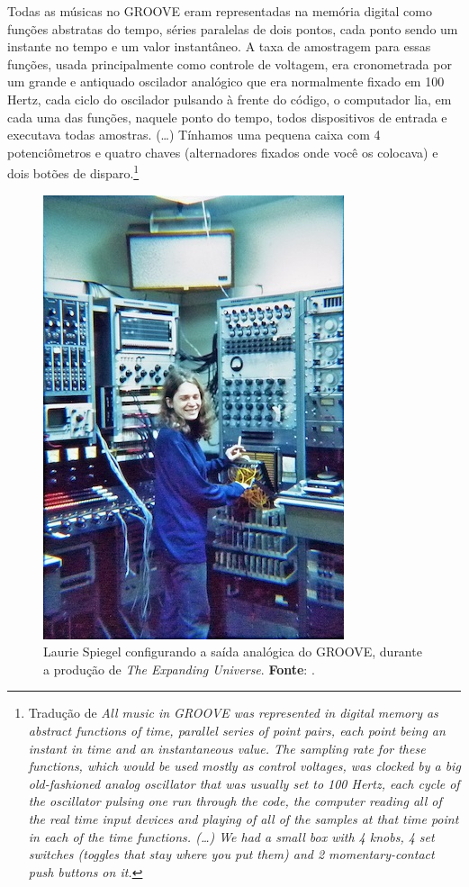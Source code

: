 \begin{citacao}
Todas as músicas no GROOVE eram representadas na memória digital como funções abstratas do tempo, séries paralelas de dois pontos, cada ponto sendo um instante no tempo e um valor instantâneo. A taxa de amostragem para essas funções, usada principalmente como controle de voltagem, era cronometrada por um grande e antiquado oscilador analógico que era normalmente fixado em 100 Hertz, cada ciclo do oscilador pulsando à frente do código, o computador lia, em cada uma das funções, naquele ponto do tempo, todos dispositivos de entrada e executava todas amostras. (\ldots) Tínhamos uma pequena caixa com 4 potenciômetros e quatro chaves (alternadores fixados onde você os colocava) e dois botões de disparo.\footnote{Tradução de \emph{All music in GROOVE was represented in digital memory as abstract functions of time, parallel series of point pairs, each point being an instant in time and an instantaneous value. The sampling rate for these functions, which would be used mostly as control voltages, was clocked by a big old-fashioned analog oscillator that was usually set to 100 Hertz, each cycle of the oscillator pulsing one run through the code, the computer reading all of the real time input devices and playing of all of the samples at that time point in each of the time functions. (\ldots)  We had a small box with 4 knobs, 4 set switches (toggles that stay where you put them) and 2 momentary-contact push buttons on it.}}
\end{citacao}

\begin{figure}[!h]
  \begin{center}
  \includegraphics[scale=0.618]{./imagens/spiegel.jpg}
  \caption{\small Laurie Spiegel configurando a saída analógica do GROOVE, durante a produção de \emph{The Expanding Universe}. \textbf{Fonte}: \cite{spiegel_expanding_1975}.}
  \label{fig:groove}
  \end{center}
\end{figure}

